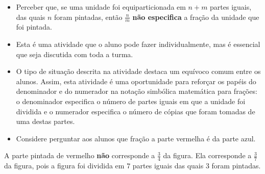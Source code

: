 \begin{atividade}\label{chap2-ativ17}
\objetivos
  \begin{itemize} %
    \item Perceber que, se uma unidade foi equiparticionada em $n + m$ partes iguais, das quais $n$ foram pintadas, então $\frac{n}{m}$ {\bfseries não especifica} a fração da unidade que foi pintada.
\end{itemize} %

\discussoes
\begin{itemize} %
    \item       Esta é uma atividade que o aluno pode fazer individualmente, mas é essencial que seja discutida com toda a turma.
    \item       O tipo de situação descrita na atividade destaca um equívoco comum entre os alunos. Assim, esta atividade é uma oportunidade para reforçar os papéis do denominador e do numerador na notação simbólica matemática para frações: o denominador especifica o número de partes iguais em que a unidade foi dividida e o numerador especifica o número de cópias que foram tomadas de uma destas partes.
      \item Considere perguntar aos alunos que fração a parte vermelha é da parte azul.

\end{itemize} %

\solucao
  A parte pintada de vermelho   {\bfseries não}   corresponde a   $\frac{3}{4}$ da figura. Ela corresponde a $\frac{3}{7}$ da figura, pois a figura foi dividida em   $7$ partes iguais das quais $3$ foram pintadas.
\end{atividade}

